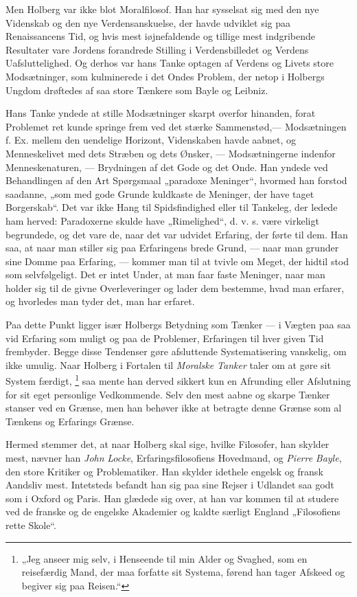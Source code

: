 \documentclass[12pt,a4paper,openany]{book}
\newcommand{\opage}[1]{\marginnote{\footnotesize\textit{[#1]}}}
\begin{document}
Men Holberg var ikke blot Moralfilosof. Han har sysselsat sig med den nye
Videnskab og den nye Verdensanskuelse, der havde udviklet sig paa Renaissancens
Tid, og hvis mest iøjnefaldende og tillige mest indgribende Resultater vare
Jordens forandrede Stilling i Verdensbilledet og Verdens Uafsluttelighed. Og
derhos var hans Tanke optagen af Verdens og Livets store Modsætninger, som
kulminerede i det Ondes Problem, der netop i Holbergs Ungdom drøftedes af saa
store Tænkere som Bayle og Leibniz.

Hans Tanke yndede at stille Modsætninger skarpt overfor hinanden, forat
Problemet ret kunde springe frem ved det stærke Sammenstød,--- Modsætningen f.
Ex. mellem den uendelige Horizont, Videnskaben havde aabnet, og Menneskelivet
med dets Stræben og dets Ønsker, --- Modsætningerne indenfor Menneskenaturen,
--- Brydningen af det Gode
\setcounter{footnote}{0}%
\opage{5}og det Onde. Han yndede ved Behandlingen af den Art Spørgsmaal
„paradoxe Meninger“, hvormed han forstod saadanne, „som med gode Grunde
kuldkaste de Meninger, der have taget Borgerskab“. Det var ikke Hang til
Spidsfindighed eller til Tankeleg, der ledede ham herved: Paradoxerne skulde
have „Rimelighed“, d. v. s. være virkeligt begrundede, og det vare de, naar det
var udvidet Erfaring, der førte til dem. Han saa, at naar man stiller sig paa
Erfaringens brede Grund, --- naar man grunder sine Domme paa Erfaring, ---
kommer man til at tvivle om Meget, der hidtil stod som selvfølgeligt. Det er
intet Under, at man faar faste Meninger, naar man holder sig til de givne
Overleveringer og lader dem bestemme, hvad man erfarer, og hvorledes man tyder
det, man har erfaret.

Paa dette Punkt ligger især Holbergs Betydning som Tænker --- i Vægten paa saa
vid Erfaring som muligt og paa de Problemer, Erfaringen til hver given Tid
frembyder. Begge disse Tendenser gøre afsluttende Systematisering vanskelig, om
ikke umulig. Naar Holberg i Fortalen til \textit{Moralske Tanker} taler om at
gøre sit System færdigt,%
\footnote[1]{„Jeg anseer mig selv, i Henseende til min Alder og Svaghed, som en
reisefærdig Mand, der maa forfatte sit Systema, førend han tager Afskeed og
begiver sig paa Reisen.“} saa mente han derved sikkert kun en Afrunding eller
Afslutning for sit eget personlige Vedkommende. Selv den mest aabne og skarpe
Tænker stanser ved en Grænse, men han behøver ikke at betragte denne Grænse som
al Tænkens og Erfarings Grænse.

Hermed stemmer det, at naar Holberg skal sige, hvilke Filosofer, han skylder
mest, nævner han \emph{John} \emph{Locke}, Erfaringsfilosofiens Hovedmand, og
\emph{Pierre} \emph{Bayle}, den store Kritiker og Problematiker. Han skylder
idethele engelsk og fransk Aandsliv mest. Intetsteds befandt han sig paa sine
Rejser i Udlandet saa godt som i Oxford og Paris. Han glædede sig over, at han
var kommen til at studere ved de franske og de engelske Akademier og kaldte
særligt England „Filosofiens rette Skole“.
\end{document}
